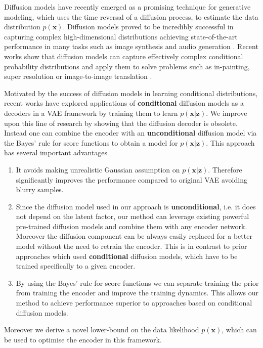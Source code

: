 Diffusion models \cite{diffusion_models, ddpm} have recently emerged as a promising technique for generative modeling, which uses the time reversal of a diffusion process, to estimate the data distribution $p(\textbf{x})$. Diffusion models proved to be incredibly successful in capturing complex high-dimensional distributions achieving state-of-the-art performance in many tasks such as image synthesis \cite{dhariwal2021diffusion_beats_gans} and audio generation \cite{kong2020diffwave}. Recent works show that diffusion models can capture effectively complex conditional probability distributions and apply them to solve problems such as in-painting, super resolution or image-to-image translation \cite{batzolis2022non_uniform, saharia2021sr3}.

Motivated by the success of diffusion models in learning conditional distributions, recent works \cite{preechakul2022diffusion_decoder, yang2023ldiffusion_decoder_compression} have explored applications of \textbf{conditional} diffusion models as a decoders in a VAE framework by training them to learn $p(\textbf{x} | \textbf{z})$. We improve upon this line of research by  showing that the diffusion decoder is obsolete. Instead one can combine the encoder with an \textbf{unconditional} diffusion model via the Bayes' rule for score functions to obtain a model for $p(\textbf{x}| \textbf{z})$.
This approach has several important advantages

\begin{enumerate}
    \item It avoids making unrealistic Gaussian assumption on $p(\textbf{x} | \textbf{z})$. Therefore significantly improves the performance compared to original VAE avoiding blurry samples.
    \item Since the diffusion model used in our approach is \textbf{unconditional}, i.e. it does not depend on the latent factor, our method can leverage existing powerful pre-trained  diffusion models and combine them with any encoder network. Moreover the diffusion component can be always easily replaced for a better model without the need to retrain the encoder. This is in contrast to prior approaches which used \textbf{conditional} diffusion models, which have to be trained specifically to a given encoder.
    \item By using the Bayes' rule for score functions we can separate training the prior from training the encoder and improve the training dynamics. This allows our method to achieve performance superior to approaches based on conditional diffusion models.
\end{enumerate}
Moreover we derive a novel lower-bound on the data likelihood $p(\textbf{x})$, which can be used to optimise the encoder in this framework.

